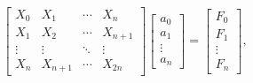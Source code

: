 \[\begin{bmatrix}X_{0}&X_{1}&\cdots&X_{n}\\
X_{1}&X_{2}&\cdots&X_{n+1}\\
\vdots&\vdots&\ddots&\vdots\\
X_{n}&X_{n+1}&\cdots&X_{2n}\end{bmatrix}\begin{bmatrix}a_{0}\\
a_{1}\\
\vdots\\
a_{n}\end{bmatrix}=\begin{bmatrix}F_{0}\\
F_{1}\\
\vdots\\
F_{n}\end{bmatrix},\]